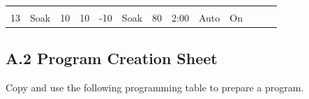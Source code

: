 \begin{longtable}[]{@{}lllllllllllll@{}}
\begin{minipage}[t]{0.08\columnwidth}
\strut
\end{minipage}\tabularnewline
\begin{minipage}[t]{0.06\columnwidth}\raggedright
13\strut
\end{minipage} & \begin{minipage}[t]{0.06\columnwidth}\raggedright
Soak\strut
\end{minipage} & \begin{minipage}[t]{0.05\columnwidth}\raggedright
10\strut
\end{minipage} & \begin{minipage}[t]{0.04\columnwidth}\raggedright
10\strut
\end{minipage} & \begin{minipage}[t]{0.04\columnwidth}\raggedright
-10\strut
\end{minipage} & \begin{minipage}[t]{0.06\columnwidth}\raggedright
Soak\strut
\end{minipage} & \begin{minipage}[t]{0.05\columnwidth}\raggedright
80\strut
\end{minipage} & \begin{minipage}[t]{0.05\columnwidth}\raggedright
2:00\strut
\end{minipage} & \begin{minipage}[t]{0.04\columnwidth}\raggedright
Auto\strut
\end{minipage} & \begin{minipage}[t]{0.03\columnwidth}\raggedright
On\strut
\end{minipage} & \begin{minipage}[t]{0.03\columnwidth}\raggedright
\strut
\end{minipage} & \begin{minipage}[t]{0.07\columnwidth}\raggedright
\strut
\end{minipage} & \begin{minipage}[t]{0.08\columnwidth}\raggedright
\strut
\end{minipage}\tabularnewline
\bottomrule
\end{longtable}


\subsection{A.2 Program Creation
Sheet}

Copy and use the following programming table to prepare a program.

